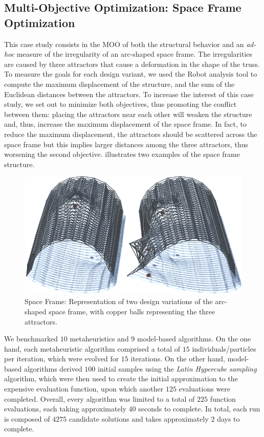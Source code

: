 \subsection{Multi-Objective Optimization: Space Frame Optimization}
This case study consists in the \ac{MOO} of both the structural behavior and an \textit{ad-hoc} measure of the irregularity of an arc-shaped space frame. The irregularities are caused by three attractors that cause a deformation in the shape of the truss. To measure the goals for each design variant, we used the Robot analysis tool to compute the maximum displacement of the structure, and the sum of the Euclidean distances between the attractors. To increase the interest of this case study, we set out to minimize both objectives, thus promoting the conflict between them: placing the attractors near each other will weaken the structure and, thus, increase the maximum displacement of the space frame. In fact, to reduce the maximum displacement, the attractors should be scattered across the space frame but this implies larger distances among the three attractors, thus worsening the second objective.  illustrates two examples of the space frame structure.
 
\begin{figure}[]
	\centering
	\includegraphics[width=\columnwidth]{Images/spaceframe/truss-kat-small.png}
	\caption{Space Frame: Representation of two design variations of the arc-shaped space frame, with copper balls representing the three attractors.}
	\label{fig:spaceframe}
\end{figure}

We benchmarked $10$ metaheuristics and $9$ model-based algorithms. On the one hand, each metaheuristic algorithm comprised a total of $15$ individuals/particles per iteration, which were evolved for $15$ iterations. On the other hand, model-based algorithms derived $100$ initial samples using the \textit{Latin Hypercube sampling} algorithm, which were then used to create the initial approximation to the expensive evaluation function, upon which another $125$ evaluations were completed. Overall, every algorithm was limited to a total of $225$ function evaluations, each taking approximately $40$ seconds to complete. In total, each run is composed of $4275$ candidate solutions and takes approximately $2$ days to complete.

